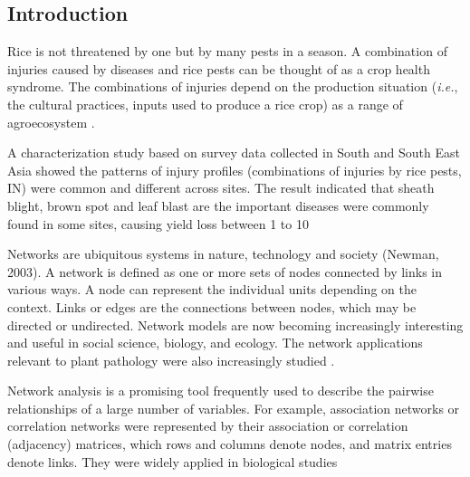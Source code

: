 
\subsection*{Introduction}

Rice is not threatened by one but by many pests in a season. A combination of injuries caused by diseases and rice pests can be thought of as a crop health syndrome. The combinations of injuries depend on the production situation (\textit{i.e.}, the cultural practices, inputs used to produce a rice crop) as a range of agroecosystem \citep{Savary_2006_Quantification}.

A characterization study based on survey data collected in South and South East Asia \citep{Savary_2000_Characterization} showed the patterns of injury profiles (combinations of injuries by rice pests, IN) were common and different across sites. The result indicated that sheath blight, brown spot and leaf blast are the important diseases were commonly found in some sites, causing yield loss between 1 to 10%

Networks are ubiquitous systems in nature, technology and society (Newman, 2003). A network is defined as one or more sets of nodes connected by links in various ways. A node can represent the individual units depending on the context. Links or edges are the connections between nodes, which may be directed or undirected. Network models are now becoming increasingly interesting and useful in social science, biology, and ecology. The network applications relevant to plant pathology were also increasingly studied \citep{Moslonka_Lefebvre_2011}.

Network analysis is a promising tool frequently used to describe the pairwise relationships of a large number of variables. For example, association networks or correlation networks were represented by their association or correlation (adjacency) matrices, which rows and columns denote nodes, and matrix entries denote links. They were widely applied in biological studies \citep{Toubiana_2013_Net, Barabasi_2004_Network}

